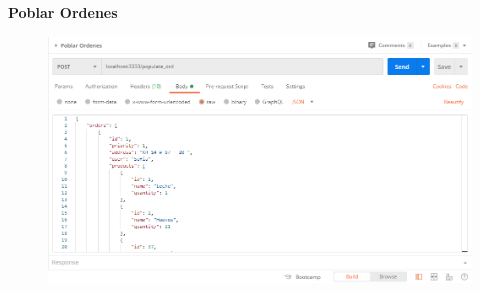 \documentclass{article}
\begin{document}
\\\\\\\\\\
\textbf{Poblar Ordenes}
\begin{figure}[h!]
\centering
\includegraphics[scale=0.4]{Pord.png}
\end{figure}
\end{document}
